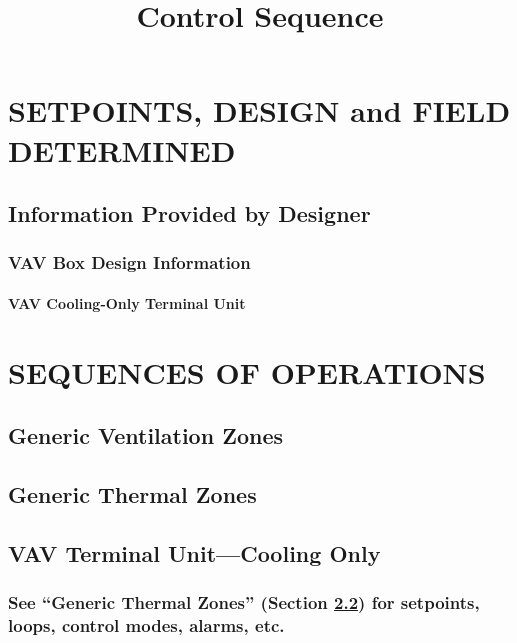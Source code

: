 \documentclass[10pt]{article}
\title{Control Sequence}
\author{}
\date{}
\begin{document}
\maketitle

\newpage

\section{SETPOINTS, DESIGN and FIELD DETERMINED}
\subsection{Information Provided by Designer}

\subsubsection{VAV Box Design Information}
\paragraph{VAV Cooling-Only Terminal Unit} \label{vav_cooling_only_terminal_unit}

\section{SEQUENCES OF OPERATIONS}

\subsection{Generic Ventilation Zones} \label{generic_ventilation_zones}
\subsection{Generic Thermal Zones} \label{generic_thermal_zones}

\subsection{VAV Terminal Unit—Cooling Only}
\subsubsection{See “Generic Thermal Zones” (Section \ref{generic_thermal_zones}) for setpoints, loops, control modes, alarms, etc.}
\end{document}
